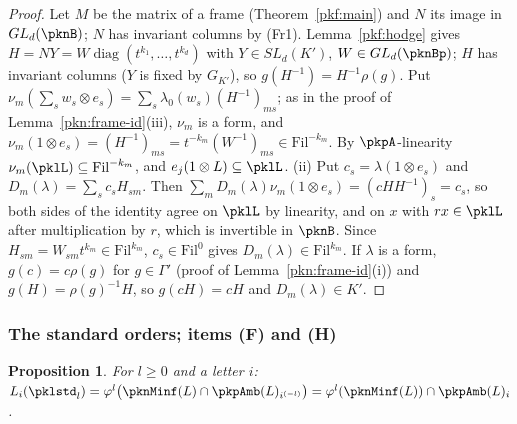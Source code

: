 \documentclass[10pt]{amsart}
\newtheorem{proposition}[theorem]{Proposition}
\theoremstyle{definition}
\theoremstyle{remark}
\begin{document}
\begin{proof}
Let $M$ be the matrix of a frame (Theorem~\ref{pkf:main}) and $N$ its image in $GL_d(\pknB)$; $N$ has invariant
columns by (Fr1). Lemma~\ref{pkf:hodge} gives $H=NY=W\operatorname{diag}(t^{k_1},\dots,t^{k_d})$ with $Y\in
SL_d(K')$, $W\in GL_d(\pknBp)$; $H$ has invariant columns ($Y$ is fixed by $G_{K'}$), so $g(H^{-1})=
H^{-1}\rho(g)$. Put $\nu_m(\sum_sw_s\otimes e_s)=\sum_s\lambda_0(w_s)(H^{-1})_{ms}$; as in the proof of
Lemma~\ref{pkn:frame-id}(iii), $\nu_m$ is a form, and $\nu_m(1\otimes e_s)=(H^{-1})_{ms}=t^{-k_m}(W^{-1})_{ms}\in
\mathrm{Fil}^{-k_m}$. By $\pkpA$-linearity $\nu_m(\pklL)\subseteq\mathrm{Fil}^{-k_m}$, and $e_j(1\otimes L)\subseteq
\pklL$. (ii) Put $c_s=\lambda(1\otimes e_s)$ and $D_m(\lambda)=\sum_sc_sH_{sm}$. Then
$\sum_mD_m(\lambda)\nu_m(1\otimes e_s)=(cHH^{-1})_s=c_s$, so both sides of the identity agree on $\pklL$ by
linearity, and on $x$ with $rx\in\pklL$ after multiplication by $r$, which is invertible in $\pknB$. Since
$H_{sm}=W_{sm}t^{k_m}\in\mathrm{Fil}^{k_m}$, $c_s\in\mathrm{Fil}^0$ gives $D_m(\lambda)\in\mathrm{Fil}^{k_m}$.
If $\lambda$ is a form, $g(c)=c\rho(g)$ for $g\in\Gamma'$ (proof of Lemma~\ref{pkn:frame-id}(i)) and
$g(H)=\rho(g)^{-1}H$, so $g(cH)=cH$ and $D_m(\lambda)\in K'$.
\end{proof}

\subsubsection{The standard orders; items (F) and (H)}\label{pkl:ss-std}

\begin{proposition}\label{pkl:std}
For $l\ge0$ and a letter $i$: $L_i(\pklstd_l)=\varphi^l\bigl(\pknMinf(L)\cap\pkpAmb(L)_{i^{(-l)}}\bigr)
=\varphi^l(\pknMinf(L))\cap\pkpAmb(L)_i$.
\end{proposition}
\end{document}
